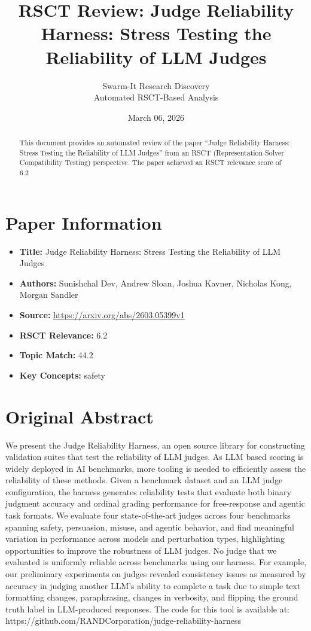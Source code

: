 \documentclass[11pt,a4paper]{article}
\title{RSCT Review: Judge Reliability Harness: Stress Testing the Reliability of LLM Judges}
\author{Swarm-It Research Discovery\\\small Automated RSCT-Based Analysis}
\date{March 06, 2026}
\begin{document}
\maketitle

\begin{abstract}
This document provides an automated review of the paper ``Judge Reliability Harness: Stress Testing the Reliability of LLM Judges'' from an RSCT (Representation-Solver Compatibility Testing) perspective. The paper achieved an RSCT relevance score of 6.2%
\end{abstract}

\section{Paper Information}
\begin{itemize}
\item \textbf{Title:} Judge Reliability Harness: Stress Testing the Reliability of LLM Judges
\item \textbf{Authors:} Sunishchal Dev, Andrew Sloan, Joshua Kavner, Nicholas Kong, Morgan Sandler
\item \textbf{Source:} \url{https://arxiv.org/abs/2603.05399v1}
\item \textbf{RSCT Relevance:} 6.2%
\item \textbf{Topic Match:} 44.2%
\item \textbf{Key Concepts:} safety
\end{itemize}

\section{Original Abstract}
We present the Judge Reliability Harness, an open source library for constructing validation suites that test the reliability of LLM judges. As LLM based scoring is widely deployed in AI benchmarks, more tooling is needed to efficiently assess the reliability of these methods. Given a benchmark dataset and an LLM judge configuration, the harness generates reliability tests that evaluate both binary judgment accuracy and ordinal grading performance for free-response and agentic task formats. We evaluate four state-of-the-art judges across four benchmarks spanning safety, persuasion, misuse, and agentic behavior, and find meaningful variation in performance across models and perturbation types, highlighting opportunities to improve the robustness of LLM judges. No judge that we evaluated is uniformly reliable across benchmarks using our harness. For example, our preliminary experiments on judges revealed consistency issues as measured by accuracy in judging another LLM's ability to complete a task due to simple text formatting changes, paraphrasing, changes in verbosity, and flipping the ground truth label in LLM-produced responses. The code for this tool is available at: https://github.com/RANDCorporation/judge-reliability-harness
\end{document}
